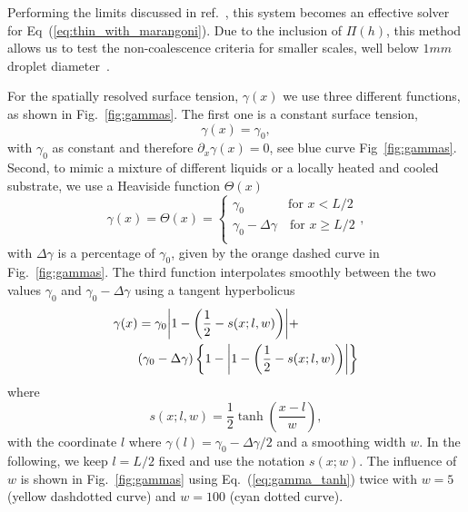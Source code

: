 \documentclass[twocolumn,amsmath,amssymb,showpacs,nofootinbib,prfluids,superscriptaddress]{revtex4-2} %
\begin{document}
Performing the limits discussed in ref.~\cite{PhysRevE.100.033313, PhysRevE.104.034801}, this system becomes an effective solver for Eq~(\ref{eq:thin_with_marangoni}).
Due to the inclusion of $\Pi(h)$, this method allows us to test the non-coalescence criteria for smaller scales, well below $1mm$ droplet diameter~\cite{doi:10.1021/la500459v, karpitschka2014sharp}.

For the spatially resolved surface tension, $\gamma(x)$ we use three different functions, as shown in Fig.~\ref{fig:gammas}.
The first one is a constant surface tension, 
\begin{equation}\label{eq:gamma_const}
    \gamma(x) = \gamma_0,
\end{equation}
with $\gamma_0$ as constant and therefore $\partial_x\gamma(x) = 0$, see blue curve Fig~\ref{fig:gammas}.
Second, to mimic a mixture of different liquids or a locally heated and cooled substrate, we use a Heaviside function $\Theta(x)$
\begin{equation}\label{eq:gamma_step}
    \gamma(x) = \Theta(x) = \begin{cases}
    \gamma_0\quad~~\qquad \text{for $x < L/2$}\\
    \gamma_0 - \Delta\gamma \quad \text{for $x \ge L/2$}\\
    \end{cases},
\end{equation}
with $\Delta\gamma$ is a percentage of $\gamma_0$, given by the orange dashed curve in Fig.~\ref{fig:gammas}.
The third function interpolates smoothly between the two values $\gamma_0$ and $\gamma_0 -\Delta\gamma$ using a tangent hyperbolicus
\begin{align}\label{eq:gamma_tanh}
    \gamma(x) &= \gamma_0\abs{1 - \left(\frac{1}{2} - s(x;l,w)\right)} + \nonumber\\
    &(\gamma_0 - \Delta\gamma)\left\{1 - \abs{1 - \left(\frac{1}{2} - s(x;l,w)\right)}\right\} 
\end{align}
where
\begin{equation}\label{eq:smoothing}
    s(x;l,w) = \frac{1}{2}\tanh\left(\frac{x - l}{w}\right),
\end{equation}
with the coordinate $l$ where $\gamma(l) = \gamma_0 -\Delta\gamma/2$ and a smoothing width $w$. 
In the following, we keep $l=L/2$ fixed and use the notation $s(x;w)$.
The influence of $w$ is shown in Fig.~\ref{fig:gammas} using Eq.~(\ref{eq:gamma_tanh}) twice with $w=5$ (yellow dashdotted curve) and $w=100$ (cyan dotted curve). 
\end{document}
